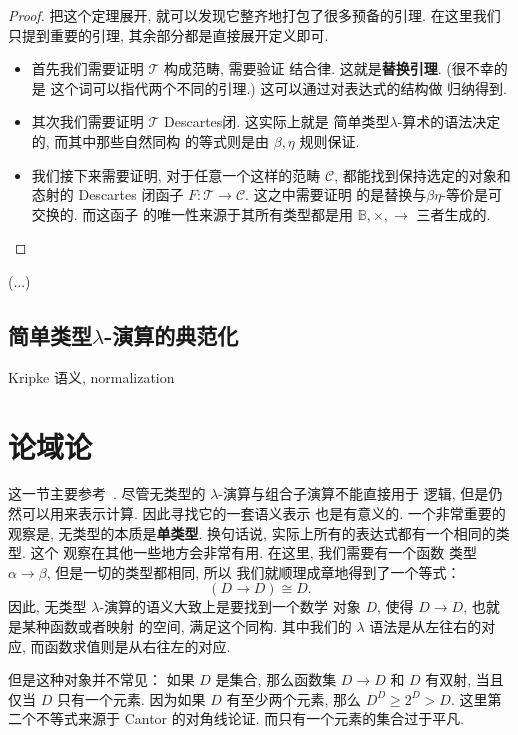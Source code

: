 \documentclass[UTF8]{ctexbook}
\theoremstyle{plain}
\theoremstyle{definition}
\theoremstyle{remark}
\begin{document}
\begin{proof}
把这个定理展开, 就可以发现它整齐地打包了很多预备的引理.
在这里我们只提到重要的引理, 其余部分都是直接展开定义即可.
\begin{itemize}
\item 首先我们需要证明 \(\mathcal T\) 构成范畴, 需要验证
结合律. 这就是\textbf{替换引理}. (很不幸的是
这个词可以指代两个不同的引理.) 这可以通过对表达式的结构做
归纳得到.
\item 其次我们需要证明 \(\mathcal T\) Descartes闭. 这实际上就是
简单类型\(\lambda\)-算术的语法决定的, 而其中那些自然同构
的等式则是由 \(\beta,\eta\) 规则保证.
\item 我们接下来需要证明, 对于任意一个这样的范畴 \(\mathcal C\),
都能找到保持选定的对象和态射的 Descartes 闭函子
\(F : \mathcal T \to \mathcal C\). 这之中需要证明
的是替换与\(\beta\eta\)-等价是可交换的. 而这函子
的唯一性来源于其所有类型都是用
\(\mathbb B, \times, \to\) 三者生成的.\qedhere
\end{itemize}
\end{proof}

(...)

\subsection{简单类型\texorpdfstring{\(\lambda\)}{Lambda}-演算的典范化}
Kripke 语义, normalization

\section{论域论}\label{beginning:domain}

这一节主要参考~\cites{abramsky:1995:domain}{cartwright:2016:domain}.
尽管无类型的 \(\lambda\)-演算与组合子演算不能直接用于
逻辑, 但是仍然可以用来表示计算. 因此寻找它的一套语义表示
也是有意义的. 一个非常重要的观察是, 无类型的本质是\textbf{单类型}.
换句话说, 实际上所有的表达式都有一个相同的类型. 这个
观察在其他一些地方会非常有用. 在这里, 我们需要有一个函数
类型 \(\alpha \to \beta\), 但是一切的类型都相同, 所以
我们就顺理成章地得到了一个等式：
\[(D \to D) \cong D.\]
因此, 无类型 \(\lambda\)-演算的语义大致上是要找到一个数学
对象 \(D\), 使得 \(D \to D\), 也就是某种函数或者映射
的空间, 满足这个同构. 其中我们的 \(\lambda\)
语法是从左往右的对应, 而函数求值则是从右往左的对应.

但是这种对象并不常见： 如果 \(D\) 是集合, 那么函数集
\(D \to D\)
和 \(D\) 有双射, 当且仅当 \(D\) 只有一个元素. 因为如果
\(D\) 有至少两个元素, 那么
\(D^D \ge 2^D > D\).
这里第二个不等式来源于 Cantor 的对角线论证.
而只有一个元素的集合过于平凡.
\end{document}
